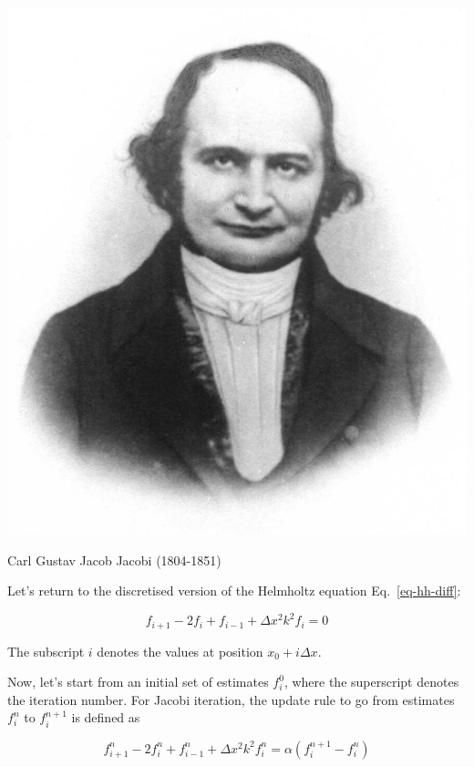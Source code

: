 \begin{marginfigure}[0.0cm]
  \includegraphics{numeric/figures/c_jacobi}
  \caption{Carl Gustav Jacob Jacobi (1804-1851)}
\end{marginfigure}

Let's return to the discretised version of the Helmholtz equation Eq.~\ref{eq-hh-diff}:

\begin{equation}
f_{i+1} -2 f_i + f_{i-1} +  \Delta x^2 k^2 f_i = 0 \label{eq-hh-diff-2}
\end{equation}  

The subscript $i$ denotes the values at position $x_0 + i \Delta x$.

Now, let's start from an initial set of estimates $f_i^0$, where the superscript denotes the iteration number. For Jacobi iteration, the update rule to go from estimates $f_i^n$ to $ f_i^{n+1}$ is defined as

\begin{equation}
f_{i+1}^n -2 f_i^n + f_{i-1}^n +  \Delta x^2 k^2 f_i^n = \alpha (f_i^{n+1} - f_i^n ) \label{eq-jacobi}
\end{equation}  

